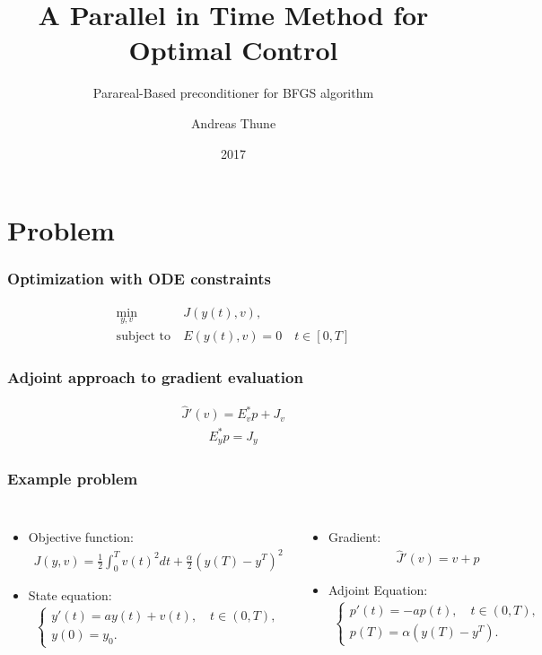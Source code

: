 \documentclass{beamer}
\title{A Parallel in Time Method for Optimal Control}
\subtitle{Parareal-Based preconditioner for BFGS algorithm}
\author{Andreas Thune}
\date{2017}
\begin{document}
 
\frame{\titlepage}
\tableofcontents
\section{Problem}
\begin{frame}
\frametitle{Optimization with ODE constraints}

\begin{align*}
\min_{y,v} &J(y(t),v), \\
\textrm{subject to} \ &E(y(t),v)=0\quad t\in[0,T]
\end{align*}
\end{frame}
\begin{frame}
\frametitle{Adjoint approach to gradient evaluation}
\begin{align*}
\hat J'(v)=E_v^*p +J_v
\end{align*}
\begin{align*}
E_y^*p = J_y
\end{align*}
\end{frame}
\begin{frame}
\frametitle{Example problem}
\begin{columns}
\begin{itemize}
\item<1->{Objective function:{\tiny\begin{align*}
J(y,v) = \frac{1}{2}\int_0^Tv(t)^2dt + \frac{\alpha}{2}(y(T)-y^T)^2 
\end{align*}
}%
}
\item<1->{State equation:{\tiny\begin{align*}
\left\{
     \begin{array}{lr}
       	y'(t)=ay(t) + v(t), \quad  t\in(0,T),\\
       	y(0)=y_0.
     \end{array}
   \right. 
\end{align*}
}%
}
\end{itemize}
\begin{itemize}
\item<2->{Gradient:{\tiny
\begin{align*}
\hat{J}'(v) = v+p
\end{align*}
}%
}
\item<3->{Adjoint Equation:{\tiny
\begin{align*}
\left\{
     \begin{array}{lr}
       	p'(t)=-ap(t), \quad  t\in(0,T),\\
       	p(T)=\alpha(y(T)-y^T).
     \end{array}
   \right. 
\end{align*}
}%
}
\end{itemize}
\end{columns}
\end{frame}
\end{document}
